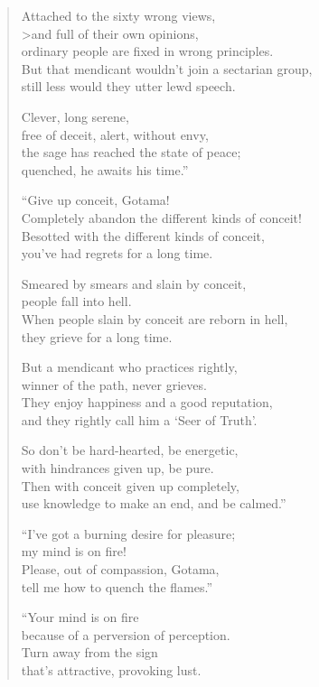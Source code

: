 \documentclass[12pt,openany]{book}%
\begin{document}
\begin{verse}
Attached to the sixty wrong views, \\>and full of their own opinions, \\
ordinary people are fixed in wrong principles. \\
But that mendicant wouldn’t join a sectarian group, \\
still less would they utter lewd speech. 

Clever, long serene, \\
free of deceit, alert, without envy, \\
the sage has reached the state of peace; \\
quenched, he awaits his time.” 

“Give up conceit, Gotama! \\
Completely abandon the different kinds of conceit! \\
Besotted with the different kinds of conceit, \\
you’ve had regrets for a long time. 

Smeared by smears and slain by conceit, \\
people fall into hell. \\
When people slain by conceit are reborn in hell, \\
they grieve for a long time. 

But a mendicant who practices rightly, \\
winner of the path, never grieves. \\
They enjoy happiness and a good reputation, \\
and they rightly call him a ‘Seer of Truth’. 

So don’t be hard-hearted, be energetic, \\
with hindrances given up, be pure. \\
Then with conceit given up completely, \\
use knowledge to make an end, and be calmed.” 

“I’ve got a burning desire for pleasure; \\
my mind is on fire! \\
Please, out of compassion, Gotama, \\
tell me how to quench the flames.” 

“Your mind is on fire \\
because of a perversion of perception. \\
Turn away from the sign \\
that’s attractive, provoking lust. 


\end{verse}
\end{document}
